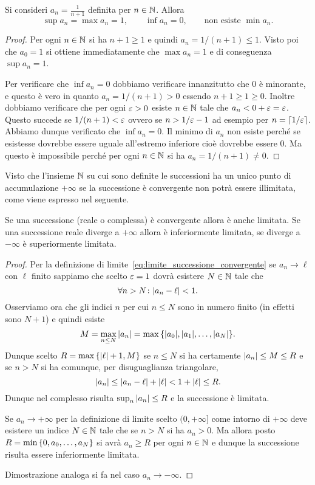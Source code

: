 \begin{example}
Si consideri $a_n = \frac{1}{n+1}$ definita per $n\in {\mathbb N}$.
Allora
\[
  \sup a_n = \max a_n = 1, \qquad
  \inf a_n = 0, \qquad \text{non esiste }\min a_n.
\]
\end{example}
\begin{proof}
Per ogni $n \in {\mathbb N}$ si ha $n+1\ge 1$ e quindi $a_n = 1/(n+1) \le 1$.
Visto poi che $a_0 = 1$ si ottiene immediatamente che $\max a_n = 1$
e di conseguenza $\sup a_n = 1$.

Per verificare che $\inf a_n = 0$ dobbiamo verificare innanzitutto
che $0$ è minorante, e questo è vero in quanto $a_n = 1/(n+1)> 0$ essendo $n+1\ge 1 \ge 0$.
Inoltre dobbiamo verificare che per ogni $\varepsilon >0$ esiste $n\in {\mathbb N}$ tale
che $a_n < 0 + \varepsilon = \varepsilon$. Questo succede se $1/(n+1) < \varepsilon$ ovvero
se $n > 1/\varepsilon -1$ ad esempio per $n=\lceil 1/\varepsilon\rceil$.
Abbiamo dunque verificato che $\inf a_n = 0$.
Il minimo di $a_n$ non esiste perché se esistesse dovrebbe essere uguale
all'estremo inferiore cioè dovrebbe essere $0$. Ma questo è impossibile
perché per ogni $n\in {\mathbb N}$ si ha $a_n = 1/(n+1)\neq 0$.
\end{proof}

Visto che l'insieme ${\mathbb N}$ su cui sono definite le successioni 
ha un unico punto di accumulazione $+\infty$ se la successione 
è convergente non potrà essere illimitata, come viene espresso nel seguente.

\begin{theorem}
\mymark{**}%
Se una successione (reale o complessa) è convergente allora è anche limitata.
Se una successione reale diverge a $+\infty$ allora è inferiormente limitata,
se diverge a $-\infty$ è superiormente limitata.
\end{theorem}
%
\begin{proof}
  Per la definizione di limite~\eqref{eq:limite_successione_convergente} 
  se $a_n\to \ell$ con $\ell$ finito sappiamo 
  che scelto $\varepsilon=1$ dovrà esistere $N\in {\mathbb N}$ tale che 
  \[
      \forall n>N\colon {\left|a_n - \ell\right|} < 1.
  \]
  Osserviamo ora che gli indici $n$ per cui $n\le N$ sono in numero finito 
  (in effetti sono $N+1$) e quindi esiste
  \[
   M = \max_{n\le N} {\left|a_n\right|} 
   = \max {\left\{ {\left|a_0\right|}, {\left|a_1\right|}, \dots , {\left|a_N\right|} \right\}}.  
  \]
  Dunque scelto $R=\max{\left\{ {\left|\ell\right|}+1,M \right\}}$ 
  se $n\le N$ si ha certamente ${\left|a_n\right|}\le M \le R$
  e se $n>N$ si ha comunque, per disuguaglianza triangolare,
  \[
  {\left|a_n\right|} \le {\left|a_n-\ell\right|} + {\left|\ell\right|} < 1+ {\left|\ell\right|} \le R.  
  \]
  Dunque nel complesso risulta $\sup_n {\left|a_n\right|}\le R$ e la successione 
  è limitata.

  Se $a_n\to +\infty$ per la definizione di limite 
  scelto $(0,+\infty]$ come intorno di $+\infty$ 
  deve esistere un indice $N\in {\mathbb N}$ tale che se $n>N$ si ha $a_n>0$. 
  Ma allora posto $R=\min{\left\{ 0, a_0,\dots,a_N \right\}}$
  si avrà $a_n\ge R$ per ogni $n\in {\mathbb N}$ e dunque la successione 
  risulta essere inferiormente limitata.

  Dimostrazione analoga si fa nel caso $a_n\to -\infty$.
\end{proof}


